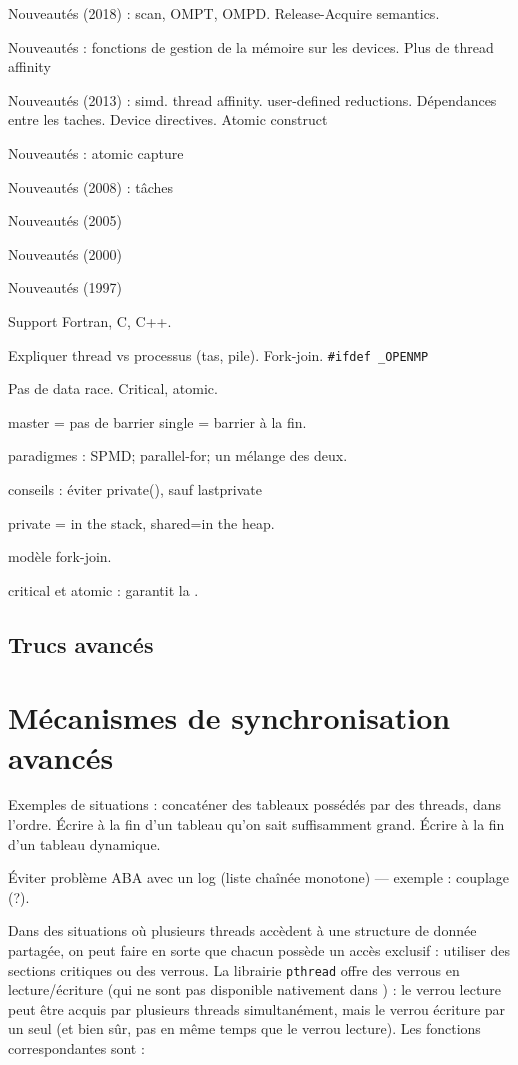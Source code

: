 Nouveautés  (2018) : scan, OMPT, OMPD. Release-Acquire semantics.

Nouveautés  : fonctions de gestion de la mémoire sur les devices. Plus de thread affinity

Nouveautés  (2013) : simd. thread affinity. user-defined reductions. Dépendances entre les taches. Device directives. Atomic construct

Nouveautés  : atomic capture

Nouveautés  (2008) : tâches

Nouveautés  (2005)

Nouveautés  (2000)

Nouveautés  (1997)

Support Fortran, C, C++.

Expliquer thread vs processus (tas, pile). Fork-join. \texttt{#ifdef _OPENMP}

Pas de data race. Critical, atomic.

master = pas de barrier
single = barrier à la fin.

paradigmes : SPMD; parallel-for; un mélange des deux.

conseils : éviter private(), sauf lastprivate

private = in the stack, shared=in the heap.

modèle fork-join.

critical et atomic : \OMP garantit la .

\section{Trucs avancés}
\chapter{Mécanismes de synchronisation avancés}

Exemples de situations : concaténer des tableaux possédés par des threads, dans l'ordre. Écrire à la fin d'un tableau qu'on sait suffisamment grand. Écrire à la fin d'un tableau dynamique.

Éviter problème ABA avec un log (liste chaînée monotone) --- exemple : couplage (?).


Dans des situations où plusieurs threads accèdent à une structure de donnée
partagée, on peut faire en sorte que chacun possède un accès exclusif : utiliser
des sections critiques ou des verrous. La librairie \texttt{pthread} offre des
verrous en lecture/écriture (qui ne sont pas disponible nativement dans \OMP) : le
verrou \og lecture\fg{} peut être acquis par plusieurs threads simultanément,
mais le verrou \og écriture\fg{} par un seul (et bien sûr, pas en même temps que
le verrou \og lecture\fg{}). Les fonctions correspondantes sont :

